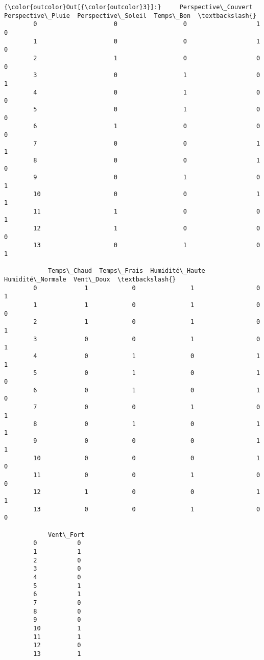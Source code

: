 \documentclass[11pt]{article}
\begin{document}
\begin{Verbatim}[commandchars=\\\{\}]
{\color{outcolor}Out[{\color{outcolor}3}]:}     Perspective\_Couvert  Perspective\_Pluie  Perspective\_Soleil  Temps\_Bon  \textbackslash{}
        0                     0                  0                   1          0   
        1                     0                  0                   1          0   
        2                     1                  0                   0          0   
        3                     0                  1                   0          1   
        4                     0                  1                   0          0   
        5                     0                  1                   0          0   
        6                     1                  0                   0          0   
        7                     0                  0                   1          1   
        8                     0                  0                   1          0   
        9                     0                  1                   0          1   
        10                    0                  0                   1          1   
        11                    1                  0                   0          1   
        12                    1                  0                   0          0   
        13                    0                  1                   0          1   
        
            Temps\_Chaud  Temps\_Frais  Humidité\_Haute  Humidité\_Normale  Vent\_Doux  \textbackslash{}
        0             1            0               1                 0          1   
        1             1            0               1                 0          0   
        2             1            0               1                 0          1   
        3             0            0               1                 0          1   
        4             0            1               0                 1          1   
        5             0            1               0                 1          0   
        6             0            1               0                 1          0   
        7             0            0               1                 0          1   
        8             0            1               0                 1          1   
        9             0            0               0                 1          1   
        10            0            0               0                 1          0   
        11            0            0               1                 0          0   
        12            1            0               0                 1          1   
        13            0            0               1                 0          0   
        
            Vent\_Fort  
        0           0  
        1           1  
        2           0  
        3           0  
        4           0  
        5           1  
        6           1  
        7           0  
        8           0  
        9           0  
        10          1  
        11          1  
        12          0  
        13          1  
\end{Verbatim}
            
\end{document}
